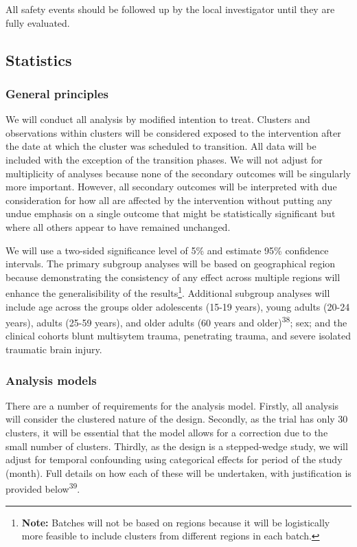 \documentclass[
]{scrartcl}
\begin{document}
All safety events should be followed up by the local investigator until
they are fully evaluated.

\hypertarget{statistics}{%
\subsection{Statistics}\label{statistics}}

\hypertarget{general-principles}{%
\subsubsection{General principles}\label{general-principles}}

We will conduct all analysis by modified intention to treat. Clusters
and observations within clusters will be considered exposed to the
intervention after the date at which the cluster was scheduled to
transition. All data will be included with the exception of the
transition phases. We will not adjust for multiplicity of analyses
because none of the secondary outcomes will be singularly more
important. However, all secondary outcomes will be interpreted with due
consideration for how all are affected by the intervention without
putting any undue emphasis on a single outcome that might be
statistically significant but where all others appear to have remained
unchanged.

We will use a two-sided significance level of 5\% and estimate 95\%
confidence intervals. The primary subgroup analyses will be based on
geographical region because demonstrating the consistency of any effect
across multiple regions will enhance the generalisibility of the
results\footnote{\textbf{Note:} Batches will not be based on regions
  because it will be logistically more feasible to include clusters from
  different regions in each batch.}. Additional subgroup analyses will
include age across the groups older adolescents (15-19 years), young
adults (20-24 years), adults (25-59 years), and older adults (60 years
and older)\textsuperscript{38}; sex; and the clinical cohorts blunt
multisytem trauma, penetrating trauma, and severe isolated traumatic
brain injury.

\hypertarget{analysis-models}{%
\subsubsection{Analysis models}\label{analysis-models}}

There are a number of requirements for the analysis model. Firstly, all
analysis will consider the clustered nature of the design. Secondly, as
the trial has only 30 clusters, it will be essential that the model
allows for a correction due to the small number of clusters. Thirdly, as
the design is a stepped-wedge study, we will adjust for temporal
confounding using categorical effects for period of the study (month).
Full details on how each of these will be undertaken, with justification
is provided below\textsuperscript{39}.
\end{document}
